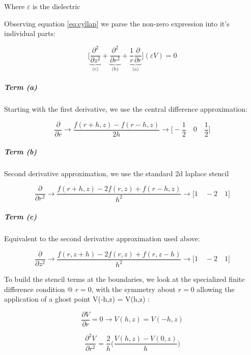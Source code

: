 Where $\varepsilon$ is the dielectric

Observing equation \autoref{eq:cyllap} we parse the non-zero expression into it's individual parts:

\begin{equation} \label{eq:cyllap_xpand}
    \bigg[\underbrace{\frac{\partial^2}{\partial z^2}}_\text{(c)} + \underbrace{\frac{\partial^2}{\partial r^2}}_\text{(b)}  + \underbrace{\frac{1}{r} \frac{\partial}{\partial r}}_\text{(a)}\bigg] (\varepsilon V) = 0
\end{equation}

\subparagraph*{Term (a)}

Starting with the first derivative, we use the central difference approximation:

\begin{equation}
    \frac{\partial}{\partial r} \rightarrow \frac{f(r + h, z) - f(r - h, z )}{2h} \rightarrow \bigg[-\frac{1}{2} \quad  0  \quad \frac{1}{2} \bigg]
\end{equation}

\subparagraph*{Term (b)}

Second derivative approximation, we use the standard 2d laplace stencil

\begin{equation}
    \frac{\partial}{\partial r^2} \rightarrow \frac{f(r+h, z) - 2 f(r, z) + f(r-h, z)}{h^2} \rightarrow \big[ 1 \quad -2 \quad 1 \big]
\end{equation}

\subparagraph*{Term (c)}
Equivalent to the second derivative approximation used above:

\begin{equation}
    \frac{\partial}{\partial z^2} \rightarrow  \frac{f(r, z+h) - 2 f(r, z) + f(r, z-h)}{h^2} \rightarrow \big[ 1\quad -2 \quad 1 \big]
\end{equation}

To build the stencil terms at the boundaries, we look at the specialized finite difference condition @ $ r = 0 $, with the symmetry about $r=0$ allowing the application of a ghost point V(-h,z) = V(h,z) :

\begin{equation}\label{eq:first_deriv_V}
	\frac{\partial V}{\partial r} = 0 \rightarrow V(h, z) = V(-h,z)
\end{equation}

\begin{equation}\label{eq:second_deriv_V}
	\frac{\partial^2 V}{\partial r^2} = \frac{2}{h}\bigg(\frac{V(h,z) -  V(0, z) }{h}\bigg) 
\end{equation}

